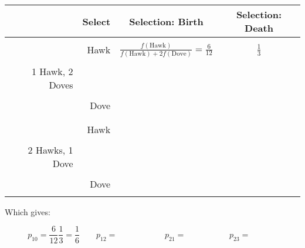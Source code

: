 \documentclass{article}
\begin{document}
\begin{center}
    \begin{tabular}{r|r|c|c}
        \toprule
        & Select       & Selection: Birth   & Selection: Death   \\
        \midrule
        &             &                                                                          & \\
        &Hawk         & \(\frac{f(\text{Hawk})}{f(\text{Hawk}) + 2f(\text{Dove})}=\frac{6}{12}\) & \(\frac{1}{3}\)\\
        &             &                                                                          & \\
1 Hawk, 2 Doves        &             &                                                                          & \\
        &             &                                                                          & \\
        &Dove         &                                                                          & \\
        &             &                                                                          & \\
        \midrule
        &             &                                                                          & \\
        &Hawk         &                                                                          & \\
        &             &                                                                          & \\
2 Hawks, 1 Dove        &             &                                                                          & \\
        &             &                                                                          & \\
        &Dove         &                                                                          & \\
        &             &                                                                          & \\
        \bottomrule
    \end{tabular}
\end{center}

Which gives:

\[
    p_{10}=\frac{6}{12}\frac{1}{3}=\frac{1}{6}\qquad
    p_{12}=\phantom{\frac{6}{12}\frac{2}{3}=\frac{1}{3}}\qquad
    p_{21}=\phantom{\frac{2}{8}\frac{2}{3}=\frac{1}{6}}\qquad
    p_{23}=\phantom{\frac{6}{8}\frac{1}{3}=\frac{1}{4}}
\]
\end{document}
